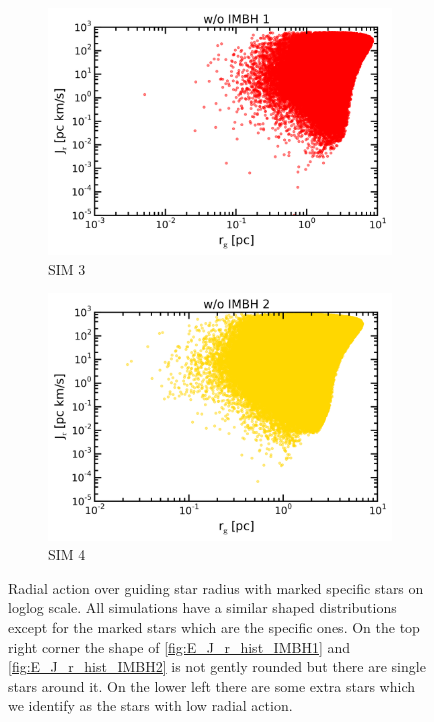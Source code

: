 \begin{figure}[htbp]
\begin{subfigure}{0.475\textwidth}
		\includegraphics[width=\textwidth]{Plots/r_g_J_r_noIMBH1.png}
		\caption{SIM 3}
		\label{fig:r_g_J_r_noIMBH1}
	\end{subfigure}
	\hfill
	\begin{subfigure}{0.475\textwidth}
		\centering
		\includegraphics[width=\textwidth]{Plots/r_g_J_r_noIMBH2.png}
		\caption{SIM 4}
		\label{fig:r_g_J_r_noIMBH2}
	\end{subfigure}
	\caption{Radial action over guiding star radius with marked specific stars on loglog scale. All simulations have a similar shaped distributions except for the marked stars which are the specific ones. On the top right corner the shape of \ref{fig:E_J_r_hist_IMBH1} and \ref{fig:E_J_r_hist_IMBH2} is not gently rounded but there are single stars around it. On the lower left there are some extra stars which we identify as the stars with low radial action.}
	\label{fig:r_g_J_r}
\end{figure}
